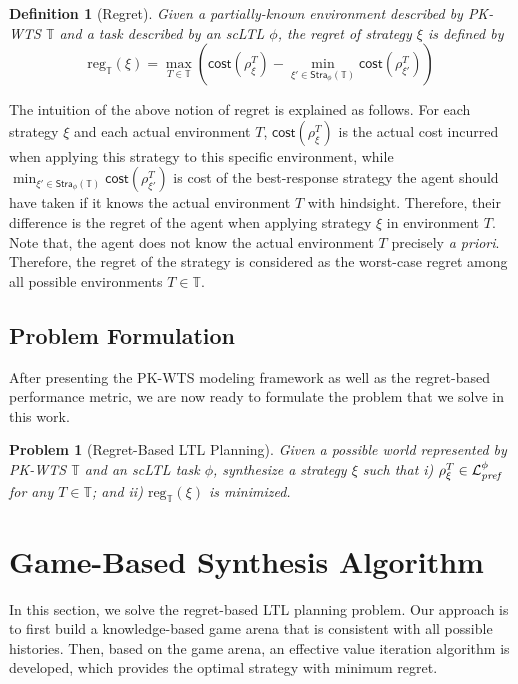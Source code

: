 \documentclass{ifacconf}
\newtheorem{definition}{Definition}
\newtheorem{problem}{Problem}
\def \L{\mathcal{L}}
\def \pref{\emph{\text{pref}}}
\def \stra{\textsf{Stra}}
\def \reg{\text{reg}}
\def \cost{\textsf{cost}}
\def \T{\mathbb{T}}
\begin{document}
\begin{definition}[Regret]\label{def:regret-in-T}
Given a partially-known environment described by PK-WTS $\T$ and a task described by an scLTL $\phi$,  the \emph{regret} of strategy $\xi$ is defined by
\begin{equation}
    \reg_\T(\xi)=\max_{T\in\T}\left(\cost(\rho_{\xi}^T)-\min_{\xi'\in\stra_\phi(\T)}\cost(\rho_{\xi'}^T)\right)
\end{equation}\vspace{0pt} 
\end{definition}

The intuition of the above notion of regret is explained as follows. 
For each strategy $\xi$ and each actual environment $T$, 
$\cost(\rho_{\xi}^T)$ is the actual cost incurred when applying this strategy to this specific environment, while $\min_{\xi'\in\stra_\phi(\T)}\cost(\rho_{\xi'}^T)$ is  cost of the best-response strategy the agent should have  taken if it knows the actual environment $T$  with hindsight. 
Therefore, their difference is the regret of the agent  when applying strategy $\xi$ in environment $T$. 
Note that, the agent does not know the actual environment $T$ precisely \emph{a priori}. Therefore, the regret of the strategy is considered as the worst-case regret among all possible environments $T\in \T$.  

\subsection{Problem Formulation}
%
After presenting the PK-WTS modeling framework as well as the regret-based performance metric, we are now ready to formulate the problem that we solve in this work. 

\begin{problem}[Regret-Based  LTL Planning]\label{pro-1}
Given a possible world represented by PK-WTS $\T$ and an scLTL task $\phi$, 
synthesize a strategy $\xi$ such that i) $ \rho^{T}_\xi\in \L_{\pref}^\phi$ for any $T\in \T$; and ii) $\reg_\T(\xi)$ is minimized. 
\end{problem} 


\section{Game-Based Synthesis Algorithm}\label{sec:game}
In this section, we solve the regret-based LTL planning problem. 
Our approach is to first build a knowledge-based game arena that is consistent with all possible histories. Then, based on the game arena, an effective value iteration algorithm is developed, which provides the optimal strategy with minimum regret. 
\end{document}
